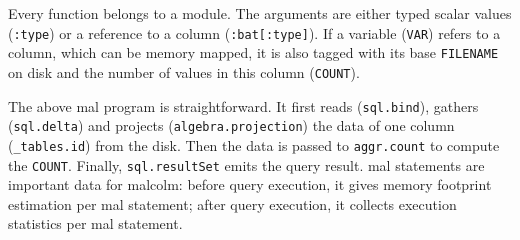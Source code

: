\documentclass[conference]{IEEEtran}
\begin{document}

Every function belongs to a module.
The arguments are either typed scalar values (\texttt{\small :type}) or a reference to a column (\texttt{\small :bat[:type]}).
If a variable (\texttt{\small VAR}) refers to a column, which can be memory mapped, it is also tagged with its base \texttt{\small FILENAME} on disk and the number of values in this column (\texttt{\small COUNT}).

The above {\sc mal} program is straightforward.
It first reads (\texttt{\small sql.bind}), gathers (\texttt{\small sql.delta}) and projects (\texttt{\small algebra.projection}) the data of one column (\texttt{\small \_tables.id}) from the disk.
Then the data is passed to \texttt{\small aggr.count} to compute the \texttt{\small COUNT}.
Finally, \texttt{\small sql.resultSet} emits the query result.
{\sc mal} statements are important data for {\sc malcolm}: before query execution, it gives memory footprint estimation per {\sc mal} statement; after query execution, it collects execution statistics per {\sc mal} statement.
\end{document}
